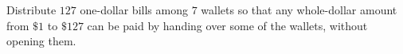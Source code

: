 Distribute $127$ one-dollar bills among $7$ wallets so that any whole-dollar amount from $\$1$ to $\$127$ can be paid by handing over some of the wallets, without opening them.
